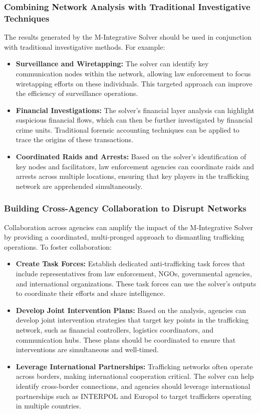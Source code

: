 \documentclass[%
 preprint, linenumbers,
 amsmath,amssymb,
 aps, physrev,
]{revtex4-2}
\begin{document}
\subsubsection{Combining Network Analysis with Traditional Investigative Techniques}

The results generated by the M-Integrative Solver should be used in conjunction with traditional investigative methods. For example:
\begin{itemize}
    \item \textbf{Surveillance and Wiretapping:} The solver can identify key communication nodes within the network, allowing law enforcement to focus wiretapping efforts on these individuals. This targeted approach can improve the efficiency of surveillance operations.
    \item \textbf{Financial Investigations:} The solver’s financial layer analysis can highlight suspicious financial flows, which can then be further investigated by financial crime units. Traditional forensic accounting techniques can be applied to trace the origins of these transactions.
    \item \textbf{Coordinated Raids and Arrests:} Based on the solver’s identification of key nodes and facilitators, law enforcement agencies can coordinate raids and arrests across multiple locations, ensuring that key players in the trafficking network are apprehended simultaneously.
\end{itemize}

\subsubsection{Building Cross-Agency Collaboration to Disrupt Networks}

Collaboration across agencies can amplify the impact of the M-Integrative Solver by providing a coordinated, multi-pronged approach to dismantling trafficking operations. To foster collaboration:
\begin{itemize}
    \item \textbf{Create Task Forces:} Establish dedicated anti-trafficking task forces that include representatives from law enforcement, NGOs, governmental agencies, and international organizations. These task forces can use the solver’s outputs to coordinate their efforts and share intelligence.
    \item \textbf{Develop Joint Intervention Plans:} Based on the analysis, agencies can develop joint intervention strategies that target key points in the trafficking network, such as financial controllers, logistics coordinators, and communication hubs. These plans should be coordinated to ensure that interventions are simultaneous and well-timed.
    \item \textbf{Leverage International Partnerships:} Trafficking networks often operate across borders, making international cooperation critical. The solver can help identify cross-border connections, and agencies should leverage international partnerships such as INTERPOL and Europol to target traffickers operating in multiple countries.
\end{itemize}
\end{document}

